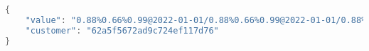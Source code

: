 \begin{lstlisting}[float,language=C,caption="Cấu trúc dữ liệu của phần nội dung đẩy lên máy chủ",label=format_ble,captionpos=b]
{
    "value": "0.88%0.66%0.99@2022-01-01/0.88%0.66%0.99@2022-01-01/0.88%0.66%0.99@2022-01-01",
    "customer": "62a5f5672ad9c724ef117d76"
}

\end{lstlisting}
